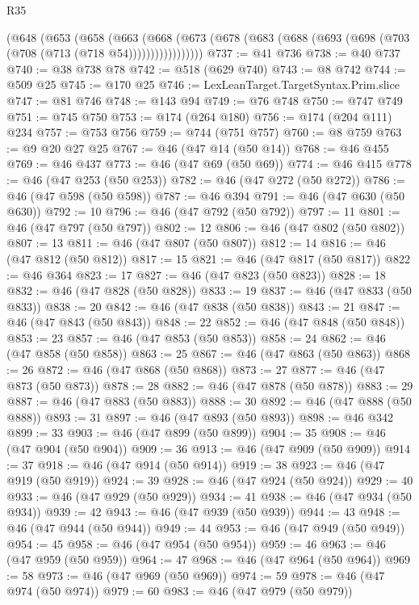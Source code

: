 \begin{lexlean}{R35}
\begin{coremodule}
        (@648
          (@653
            (@658
              (@663
                (@668
                  (@673 (@678 (@683 (@688 (@693 (@698 (@703 (@708 (@713 (@718 @54)))))))))))))))))
@737 := @41 @736
@738 := @40 @737
@740 := @38 @738 @78
@742 := @518 (@629 @740)
@743 := @8 @742
@744 := @509 @25
@745 := @170 @25
@746 := LexLeanTarget.TargetSyntax.Prim.slice
@747 := @81 @746
@748 := @143 @94
@749 := @76 @748
@750 := @747 @749
@751 := @745 @750
@753 := @174 (@264 @180)
@756 := @174 (@204 @111) @234
@757 := @753 @756
@759 := @744 (@751 @757)
@760 := @8 @759
@763 := @9 @20 @27 @25
@767 := @46 (@47 @14 (@50 @14))
@768 := @46 @455
@769 := @46 @437
@773 := @46 (@47 @69 (@50 @69))
@774 := @46 @415
@778 := @46 (@47 @253 (@50 @253))
@782 := @46 (@47 @272 (@50 @272))
@786 := @46 (@47 @598 (@50 @598))
@787 := @46 @394
@791 := @46 (@47 @630 (@50 @630))
@792 := 10
@796 := @46 (@47 @792 (@50 @792))
@797 := 11
@801 := @46 (@47 @797 (@50 @797))
@802 := 12
@806 := @46 (@47 @802 (@50 @802))
@807 := 13
@811 := @46 (@47 @807 (@50 @807))
@812 := 14
@816 := @46 (@47 @812 (@50 @812))
@817 := 15
@821 := @46 (@47 @817 (@50 @817))
@822 := @46 @364
@823 := 17
@827 := @46 (@47 @823 (@50 @823))
@828 := 18
@832 := @46 (@47 @828 (@50 @828))
@833 := 19
@837 := @46 (@47 @833 (@50 @833))
@838 := 20
@842 := @46 (@47 @838 (@50 @838))
@843 := 21
@847 := @46 (@47 @843 (@50 @843))
@848 := 22
@852 := @46 (@47 @848 (@50 @848))
@853 := 23
@857 := @46 (@47 @853 (@50 @853))
@858 := 24
@862 := @46 (@47 @858 (@50 @858))
@863 := 25
@867 := @46 (@47 @863 (@50 @863))
@868 := 26
@872 := @46 (@47 @868 (@50 @868))
@873 := 27
@877 := @46 (@47 @873 (@50 @873))
@878 := 28
@882 := @46 (@47 @878 (@50 @878))
@883 := 29
@887 := @46 (@47 @883 (@50 @883))
@888 := 30
@892 := @46 (@47 @888 (@50 @888))
@893 := 31
@897 := @46 (@47 @893 (@50 @893))
@898 := @46 @342
@899 := 33
@903 := @46 (@47 @899 (@50 @899))
@904 := 35
@908 := @46 (@47 @904 (@50 @904))
@909 := 36
@913 := @46 (@47 @909 (@50 @909))
@914 := 37
@918 := @46 (@47 @914 (@50 @914))
@919 := 38
@923 := @46 (@47 @919 (@50 @919))
@924 := 39
@928 := @46 (@47 @924 (@50 @924))
@929 := 40
@933 := @46 (@47 @929 (@50 @929))
@934 := 41
@938 := @46 (@47 @934 (@50 @934))
@939 := 42
@943 := @46 (@47 @939 (@50 @939))
@944 := 43
@948 := @46 (@47 @944 (@50 @944))
@949 := 44
@953 := @46 (@47 @949 (@50 @949))
@954 := 45
@958 := @46 (@47 @954 (@50 @954))
@959 := 46
@963 := @46 (@47 @959 (@50 @959))
@964 := 47
@968 := @46 (@47 @964 (@50 @964))
@969 := 58
@973 := @46 (@47 @969 (@50 @969))
@974 := 59
@978 := @46 (@47 @974 (@50 @974))
@979 := 60
@983 := @46 (@47 @979 (@50 @979))

\end{coremodule}
\end{lexlean}

